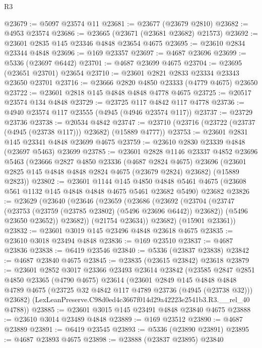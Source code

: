 \begin{lexlean}{R3}
\begin{coremodule}
@23679 := @5097 @23574 @11
@23681 := @23677 (@23679 @2810)
@23682 := @4953 @23574
@23686 := @23665 (@23671 (@23681 @23682) @21573)
@23692 := @23601 @2835 @145 @23346 @4848 @23654 @4675
@23695 := @23610 @2834 @23344 @4848
@23696 := @169 @23357
@23697 := @4687 @23696
@23699 := @5336 (@23697 @6442)
@23701 := @4687 @23699 @4675
@23704 := @23695 (@23651 @23701) @23654
@23710 := @23601 @2821 @2833 @23334 @23343 @23650 @23701
@23716 := @23666 @2820 @4850 @23333 (@4779 @4675) @23650
@23722 := @23601 @2818 @145 @4848 @4848 @4778 @4675
@23725 := @20517 @23574 @134 @4848
@23729 := @23725 @117 @4842 @117 @4778
@23736 := @4940 @23574 @117 @23555 (@4945 (@4946 @23574 @117))
@23737 := @23729 @23736
@23738 := @20534 @4842
@23747 := @23710 (@23716 (@23722 (@23737 (@4945 (@23738 @117))) @23682) (@15889 @4777))
@23753 := @23601 @2831 @145 @23341 @4848 @23699 @4675
@23759 := @23610 @2830 @23339 @4848 (@23697 @5463) @23699
@23785 := @23601
    @2828
    @1146
    @23337
    @4852
    @23696
    @5463
    (@23666
      @2827
      @4850
      @23336
      (@4687 @2824 @4675)
      @23696
      (@23601 @2825 @145 @4848 @4848 @2824 @4675 (@23679 @2824) @23682)
      (@15889 @2823))
@23802 := @23601
    @1144
    @145
    @4850
    @4848
    @5461
    @4675
    (@23608 @561 @1132 @145 @4848 @4848 @4675 @5461 @23682 @5490)
    @23682
@23826 := @23629
    (@23640
      (@23646
        (@23659
          (@23686
            (@23692
              (@23704
                (@23747 (@23753 (@23759 (@23785 @23802) (@5496 @23696 @6442)) @23682))
                (@5496 @23650 @23652))
              @23682))
          (@21754 @23634))
        @23682)
      (@15901 @23361))
@23832 := @23601 @3019 @145 @23496 @4848 @23618 @4675
@23835 := @23610 @3018 @23494 @4848
@23836 := @169 @23510
@23837 := @4687 @23836
@23838 := @6419 @23546
@23840 := @5336 (@23837 @23838)
@23842 := @4687 @23840 @4675
@23845 := @23835 (@23615 @23842) @23618
@23879 := @23601
    @2852
    @3017
    @23366
    @23493
    @23614
    @23842
    (@23585
      @2847
      @2851
      @4850
      @23365
      (@4790 @4675)
      @23614
      (@23601
        @2849
        @145
        @4848
        @4848
        @4789
        @4675
        (@23725 @32 @4842 @117 @4789 @23736 (@4945 (@23738 @32)))
        @23682)
      (LexLeanPreserve.C98d0ed4c3667f014d29a42223e2541b3.R3.__rel_40 @4788))
@23885 := @23601 @3015 @145 @23491 @4848 @23840 @4675
@23888 := @23610 @3014 @23489 @4848
@23889 := @169 @23512
@23890 := @4687 @23889
@23891 := @6419 @23545
@23893 := @5336 (@23890 @23891)
@23895 := @4687 @23893 @4675
@23898 := @23888 (@23837 @23895) @23840

\end{coremodule}
\end{lexlean}
